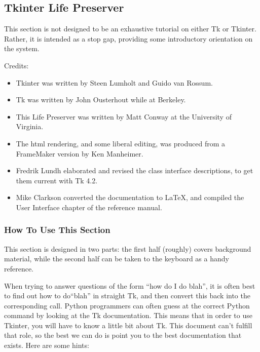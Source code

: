 \subsection{Tkinter Life Preserver}

This section is not designed to be an exhaustive tutorial on either
Tk or Tkinter.  Rather, it is intended as a stop gap, providing some
introductory orientation on the system.

Credits:
\begin{itemize}
\item   Tkinter was written by Steen Lumholt and Guido van Rossum.
\item   Tk was written by John Ousterhout while at Berkeley.
\item   This Life Preserver was written by Matt Conway at
the University of Virginia.
\item   The html rendering, and some liberal editing, was
produced from a FrameMaker version by Ken Manheimer.
\item   Fredrik Lundh elaborated and revised the class interface descriptions,
to get them current with Tk 4.2.
\item  Mike Clarkson converted the documentation to \LaTeX, and compiled the 
User Interface chapter of the reference manual.
\end{itemize}


\subsubsection{How To Use This Section}

This section is designed in two parts: the first half (roughly) covers
background material, while the second half can be taken to the
keyboard as a handy reference.

When trying to answer questions of the form ``how do I do blah'', it
is often best to find out how to do``blah'' in straight Tk, and then
convert this back into the corresponding  call.
Python programmers can often guess at the correct Python command by
looking at the Tk documentation. This means that in order to use
Tkinter, you will have to know a little bit about Tk. This document
can't fulfill that role, so the best we can do is point you to the
best documentation that exists. Here are some hints:

